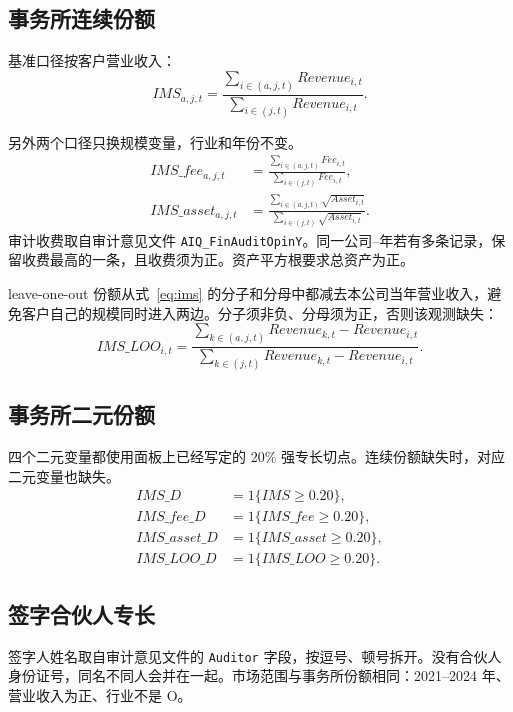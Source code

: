 \documentclass[11pt]{article}
\begin{document}
\subsection{事务所连续份额}

基准口径按客户营业收入：
\begin{equation}
IMS_{a,j,t}=\frac{\sum_{i\in(a,j,t)}Revenue_{i,t}}{\sum_{i\in(j,t)}Revenue_{i,t}}.
\label{eq:ims}
\end{equation}

另外两个口径只换规模变量，行业和年份不变。
\begin{align}
IMS\_fee_{a,j,t}&=\frac{\sum_{i\in(a,j,t)}Fee_{i,t}}{\sum_{i\in(j,t)}Fee_{i,t}}, \label{eq:imsfee}\\
IMS\_asset_{a,j,t}&=\frac{\sum_{i\in(a,j,t)}\sqrt{Asset_{i,t}}}{\sum_{i\in(j,t)}\sqrt{Asset_{i,t}}}. \label{eq:imsasset}
\end{align}
审计收费取自审计意见文件 \texttt{AIQ\_FinAuditOpinY}。同一公司--年若有多条记录，保留收费最高的一条，且收费须为正。资产平方根要求总资产为正。

leave-one-out 份额从式~\eqref{eq:ims} 的分子和分母中都减去本公司当年营业收入，避免客户自己的规模同时进入两边。分子须非负、分母须为正，否则该观测缺失：
\begin{equation}
IMS\_LOO_{i,t}=\frac{\sum_{k\in(a,j,t)}Revenue_{k,t}-Revenue_{i,t}}{\sum_{k\in(j,t)}Revenue_{k,t}-Revenue_{i,t}}.
\label{eq:imsloo}
\end{equation}

\subsection{事务所二元份额}

四个二元变量都使用面板上已经写定的 20\% 强专长切点。连续份额缺失时，对应二元变量也缺失。
\begin{align*}
IMS\_D&=1\{IMS\ge 0.20\},\\
IMS\_fee\_D&=1\{IMS\_fee\ge 0.20\},\\
IMS\_asset\_D&=1\{IMS\_asset\ge 0.20\},\\
IMS\_LOO\_D&=1\{IMS\_LOO\ge 0.20\}.
\end{align*}

\subsection{签字合伙人专长}

签字人姓名取自审计意见文件的 \texttt{Auditor} 字段，按逗号、顿号拆开。没有合伙人身份证号，同名不同人会并在一起。市场范围与事务所份额相同：2021--2024 年、营业收入为正、行业不是 O。
\end{document}
